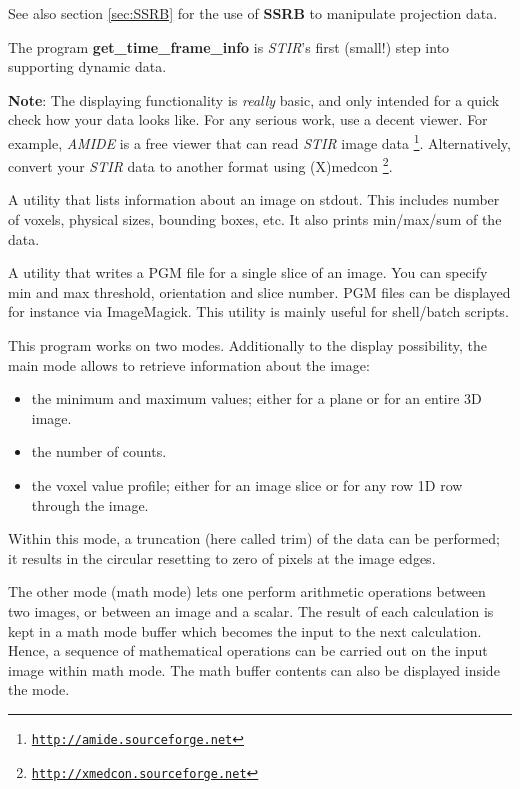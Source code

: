 \documentclass{article}
\def\R2Lurl#1#2{\mbox{\href{#1}{\tt #2}}}
\begin{document}
See also section \ref{sec:SSRB} for the use of \textbf{SSRB} to manipulate projection 
data.


The program \textbf{get\_time\_frame\_info} is \textit{STIR}'s first (small!) 
step into supporting dynamic data.


\textbf{Note}: The displaying functionality is \textit{really} basic, and 
only intended for a quick check how your data looks like. For 
any serious work, use a decent viewer. For example, \textit{AMIDE} 
is a free viewer that can read \textit{STIR} image data
\footnote{\R2Lurl{http://amide.sourceforge.net }{http://amide.sourceforge.net}}. Alternatively, 
convert your \textit{STIR} data to another format using (X)medcon
\footnote{\R2Lurl{http://xmedcon.sourceforge.net }{http://xmedcon.sourceforge.net}}.

{ 
}

A utility that lists information about an image on stdout. This includes number of voxels,
physical sizes, bounding boxes, etc. It also prints min/max/sum of the data. 

{ 
}

A utility that writes a PGM file for a single slice of an image. You can specify min and max threshold,
orientation and slice number. PGM files can be displayed for instance via ImageMagick.
This utility is mainly useful for shell/batch scripts.

{ 
}

This program works on two modes. Additionally to the display 
possibility, the main mode allows to retrieve information about 
the image:

\begin{itemize}
\item the minimum and maximum values; either for a plane or for an 
entire 3D image.
\item the number of counts.
\item the voxel value profile; either for an image slice or for any 
row 1D row through the image.
\end{itemize}
Within this mode, a truncation (here called trim) of the data 
can be performed; it results in the circular resetting to zero 
of pixels at the image edges.


The other mode (math mode) lets one perform arithmetic operations 
between two images, or between an image and a scalar. The result 
of each calculation is kept in a math mode buffer which becomes 
the input to the next calculation. Hence, a sequence of mathematical 
operations can be carried out on the input image within math 
mode. The math buffer contents can also be displayed inside the 
mode.
\end{document}
